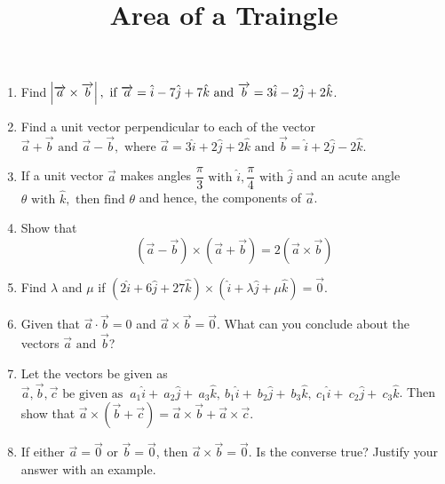 \documentclass[12pt]{article}
\begin{document}
\title{\textbf{Area of a Traingle}}
\maketitle
\begin{center}
\end{center}

\begin{enumerate}
\section*{12$^{th}$ Maths - Chapter 10}

\item Find $\abs{\overrightarrow{a}\times\overrightarrow{b}},\text{ if }\overrightarrow{a}=\hat{i}-7\hat{j}+7\hat{k}\text{ and } \overrightarrow{b}=3\hat{i}-2\hat{j}+2\hat{k}$.
\item Find a unit vector perpendicular to each of the vector $\overrightarrow{a}+\overrightarrow{b}\text{ and }\overrightarrow{a}-\overrightarrow{b},\text{ where } \overrightarrow{a}=3\hat{i}+2\hat{j}+2\hat{k}\text{ and } \overrightarrow{b}=\hat{i}+2\hat{j}-2\hat{k}$. 
\item If a unit vector $\overrightarrow{a}$ makes angles $\dfrac{\pi}{3}\text{ with }\hat{i}, \dfrac{\pi}{4}\text{ with }\hat{j}$ and an acute angle $\theta \text{ with }\hat{k},\text{ then find } \theta$ and hence, the components of $\overrightarrow{a}$.
\item Show that $$(\overrightarrow{a}-\overrightarrow{b})\times (\overrightarrow{a}+\overrightarrow{b})=2(\overrightarrow{a}\times \overrightarrow{b})$$
\item Find $\lambda$ and $\mu$ if $(2\hat{i}+6\hat{j}+27\hat{k})\times(\hat{i}+\lambda \hat{j} + \mu \hat{k})=\overrightarrow{0}$.
\item Given that $\overrightarrow{a} \cdot \overrightarrow{b} = 0$ and $\overrightarrow{a} \times \overrightarrow{b} = \overrightarrow{0}$. What can you conclude about the vectors $\overrightarrow{a} \text{ and }\overrightarrow{b}$?
\item Let the vectors be given as $\overrightarrow{a},\overrightarrow{b},\overrightarrow{c}\text{ be given as }\ a_1 \hat{i}+\ a_2 \hat{j}+\ a_3 \hat{k},\ b_1 \hat{i}+\ b_2 \hat{j}+\ b_3 \hat{k},\ c_1 \hat{i}+\ c_2 \hat{j}+\ c_3 \hat{k}$. Then show that $\overrightarrow{a} \times (\overrightarrow{b} + \overrightarrow{c}) = \overrightarrow{a} \times \overrightarrow{b}+\overrightarrow{a} \times \overrightarrow{c}$.
\item If either $\overrightarrow{a} = \overrightarrow{0}$ or $\overrightarrow{b} = \overrightarrow{0}$, then $\overrightarrow{a} \times \overrightarrow{b} = \overrightarrow{0}$. Is the converse true? Justify your answer with an example.

\end{enumerate}
\end{document}

